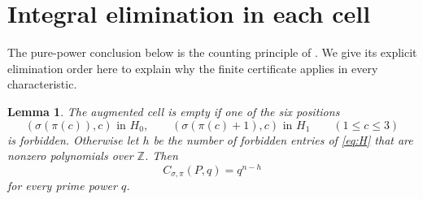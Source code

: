 \documentclass[11pt]{article}
\newtheorem{lemma}{Lemma}
\newcommand{\Z}{\mathbb Z}
\begin{document}
\section{Integral elimination in each cell}

The pure-power conclusion below is the counting principle of
\cite[Theorem 4.4 and Section 5.1]{KL}. We give its explicit elimination
order here to explain why the finite certificate applies in every
characteristic.

\begin{lemma}\label{lem:cell}
The augmented cell is empty if one of the six positions
\begin{equation}\label{eq:pivots}
 (\sigma(\pi(c)),c)\text{ in }H_0,\qquad
 (\sigma(\pi(c)+1),c)\text{ in }H_1\qquad(1\leq c\leq3)
\end{equation}
is forbidden. Otherwise let $h$ be the number of forbidden entries of
\eqref{eq:H} that are nonzero polynomials over $\Z$. Then
\begin{equation}\label{eq:cell}
 C_{\sigma,\pi}(P,q)=q^{n-h}
\end{equation}
for every prime power $q$.
\end{lemma}
\end{document}
